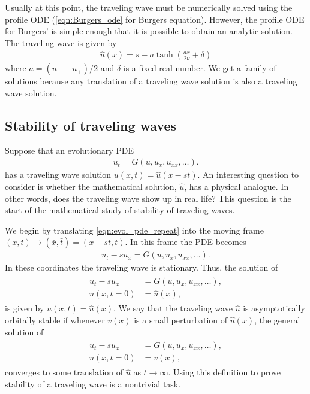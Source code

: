 Usually at this point, the traveling wave must be numerically solved using the profile ODE (\eqref{eqn:Burgers_ode} for Burgers equation).
However, the profile ODE for Burgers' is simple enough that it is possible to obtain an analytic solution.
The traveling wave is  given by
\begin{align}
\hat{u}(x) = s - a \tanh \left(\frac{ax }{2\nu} + \delta\right)
\label{eqn:waveeqn:uhat}
\end{align}
where $a = (u_- - u_+)/2$ and $\delta$ is a fixed real number.
We get a family of solutions because any translation of a traveling wave solution is also a traveling wave solution.

\subsection*{Stability of traveling waves}
Suppose that an evolutionary PDE
\begin{align}
u_t = G(u,u_x, u_{xx}, \ldots).
\label{eqn:evol_pde_repeat}
\end{align}
has a traveling wave solution $u(x,t) = \hat{u}(x-st)$.
An interesting question to consider is whether the mathematical solution, $\hat{u}$, has a physical analogue.
In other words, does the traveling wave show up in real life?
This question is the start of the mathematical study of stability of traveling waves.

We begin by translating \eqref{eqn:evol_pde_repeat} into the moving frame $(x,t) \to (\bar{x},\bar{t}) = (x-st, t)$.
In this frame the PDE becomes
\begin{align*}
u_t - su_x = G(u,u_x, u_{xx}, \ldots).
\end{align*}
In these coordinates the traveling wave is stationary.
Thus, the solution of
\begin{align*}
\begin{split}
u_t - su_x &= G(u,u_x, u_{xx}, \ldots), \\
u(x,t = 0) &= \hat{u}(x),
\end{split}
\end{align*}
is given by $u(x,t) = \hat{u}(x)$.
We say that the traveling wave $\hat{u}$ is asymptotically orbitally stable if whenever $v(x)$ is a small perturbation of $\hat{u}(x)$, the general solution of
\begin{align*}
\begin{split}
u_t - su_x &= G(u,u_x, u_{xx}, \ldots), \\
u(x,t = 0) &= v(x),
\end{split}
\end{align*}
converges to some translation of $\hat{u}$ as $t \to \infty$.
Using this definition to prove stability of a traveling wave is a nontrivial task.

